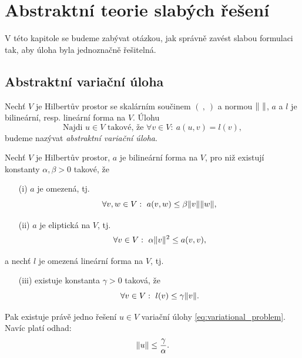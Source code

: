





\section{Abstraktní teorie slabých řešení}

V této kapitole se budeme zabývat otázkou, jak správně zavést slabou formulaci tak, aby úloha byla jednoznačně řešitelná.

\subsection{Abstraktní variační úloha}

Nechť $V$ je Hilbertův prostor se skalárním součinem $(\ ,\ )$ a normou $\|\ \|$, $a$ a $l$ je bilineární, resp. lineární forma na $V$.
Úlohu
\begin{equation}
\label{eq:variational_problem}
\text{Najdi }u\in V \text{ takové, že }\forall v\in V:~a(u,v)=l(v),
\end{equation}
budeme nazývat \emph{abstraktní variační úloha}.


\begin{veta}
Nechť $V$ je Hilbertův prostor, $a$ je bilineární forma na $V$, pro niž existují konstanty $\alpha,\beta>0$ takové, že
\begin{itemize}
\item[(i)] $a$ je omezená, tj.
\[ \forall v,w\in V:~a(v,w)\le \beta\|v\|\|w\|, \]
\item[(ii)] $a$ je eliptická na $V$, tj.
\[ \forall v\in V:~\alpha\|v\|^2\le a(v,v), \]
\end{itemize}
a nechť $l$ je omezená lineární forma na $V$, tj.
\begin{itemize}
\item[(iii)] existuje konstanta $\gamma>0$ taková, že 
\[ \forall v\in V:~l(v)\le \gamma\|v\|. \]
\end{itemize}
Pak existuje právě jedno řešení $u\in V$ variační úlohy \eqref{eq:variational_problem}.
Navíc platí odhad:
\[ \|u\| \le \frac\gamma\alpha. \]
\end{veta}


